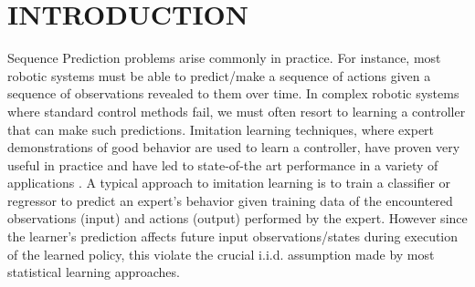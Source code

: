 \documentclass[twoside]{article}
\begin{document}
\begin{abstract}
Sequential prediction problems such as imitation learning, where future observations depend on previous predictions (actions), violate the common i.i.d. assumptions made in statistical learning. This leads to poor performance in theory and often in practice. Some recent approaches \citep{Daume09, Ross10} provide stronger guarantees in this setting, but remain somewhat unsatisfactory as they train either non-stationary or stochastic policies and require a large number of iterations. In this paper, we propose a new iterative algorithm, which trains a stationary deterministic policy, that can be seen as a no regret algorithm in an online learning setting. We show that any such no regret algorithm, combined with additional reduction assumptions, must find a policy with good performance under the distribution of observations it induces in such sequential settings. We demonstrate that this new approach outperforms previous approaches on two challenging imitation learning problems and a benchmark sequence labeling problem.
\end{abstract}


\section{INTRODUCTION}
%
Sequence Prediction problems arise commonly in practice. For instance, most robotic systems must be able to predict/make a sequence of actions given a sequence of observations revealed to them over time. In complex robotic systems where standard control methods fail, we must often resort to learning a controller that can make such predictions. Imitation learning techniques, where expert demonstrations of good behavior are used to learn a controller, have proven very useful in practice and have led to state-of-the art performance in a variety of applications \citep{Schaal99, Abbeel04, Ratliff06, Silver08, Argall09, Chernova09, Ross10}. A typical approach to imitation learning is to train a classifier or regressor to predict an expert's behavior given training data of the encountered observations (input) and actions (output) performed by the expert. However since the learner's prediction affects future input observations/states during execution of the learned policy, this violate the crucial i.i.d. assumption made by most statistical learning approaches.

\end{document}
